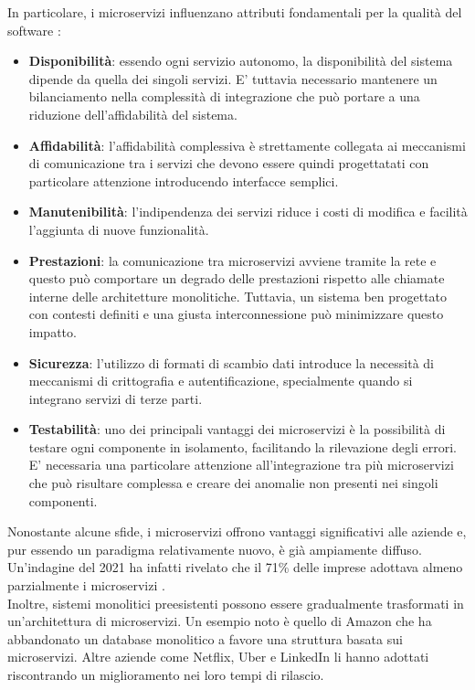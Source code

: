 In particolare, i microservizi influenzano attributi fondamentali per la qualità del software \cite{dragoni2017}:
\begin{itemize}
    \item \textbf{Disponibilità}: essendo ogni servizio autonomo, la disponibilità del sistema dipende da quella dei singoli servizi. E' tuttavia necessario mantenere un bilanciamento nella complessità di integrazione che può portare a una riduzione dell'affidabilità del sistema.
    \item \textbf{Affidabilità}: l'affidabilità complessiva è strettamente collegata ai meccanismi di comunicazione tra i servizi che devono essere quindi progettatati con particolare attenzione introducendo interfacce semplici.
    \item \textbf{Manutenibilità}: l'indipendenza dei servizi riduce i costi di modifica e facilità l'aggiunta di nuove funzionalità.
    \item \textbf{Prestazioni}: la comunicazione tra microservizi avviene tramite la rete e questo può comportare un degrado delle prestazioni rispetto alle chiamate interne delle architetture monolitiche. Tuttavia, un sistema ben progettato con contesti definiti e una giusta interconnessione può minimizzare questo impatto.
    \item \textbf{Sicurezza}: l'utilizzo di formati di scambio dati introduce la necessità di meccanismi di crittografia e autentificazione, specialmente quando si integrano servizi di terze parti.
    \item \textbf{Testabilità}: uno dei principali vantaggi dei microservizi è la possibilità di testare ogni componente in isolamento, facilitando la rilevazione degli errori. E' necessaria una particolare attenzione all'integrazione tra più microservizi che può risultare complessa e creare dei anomalie non presenti nei singoli componenti.
\end{itemize}
Nonostante alcune sfide, i microservizi offrono vantaggi significativi alle aziende e, pur essendo un paradigma relativamente nuovo,
è già ampiamente diffuso. 
Un'indagine del 2021 ha infatti rivelato che il 71\% delle imprese adottava almeno parzialmente i microservizi \cite{stat}.
\\Inoltre, sistemi monolitici preesistenti possono essere gradualmente trasformati in un'architettura di microservizi.
Un esempio noto è quello di Amazon che ha abbandonato un database monolitico a favore una struttura basata sui microservizi.
Altre aziende come Netflix, Uber e LinkedIn li hanno adottati riscontrando un miglioramento nei loro tempi di rilascio.

